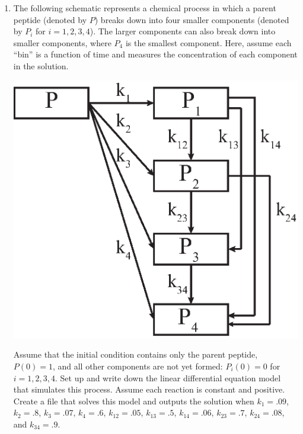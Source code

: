 \documentclass[10pt]{article}
\begin{document}
\begin{enumerate}[{$\qquad 1.]
\item The following schematic represents a chemical process in which a parent peptide (denoted by $P$) breaks down into four smaller components (denoted by $P_i$ for $i = 1, 2, 3, 4$).  The larger components can also break down into smaller components, where $P_4$ is the smallest component.  Here, assume each ``bin'' is a function of time and measures the concentration of each component in the solution.  
\begin{center}
\includegraphics[width = .3\textwidth]{Peptide_Final_Schematic.eps}
\end{center}
Assume that the initial condition contains only the parent peptide, $P(0) = 1$, and all other components are not yet formed: $P_i(0)  = 0$ for $i = 1, 2, 3, 4$.  Set up and write down the linear differential equation model that simulates this process.  Assume each reaction is constant and positive.  Create a file that solves this model and outputs the solution when $k_1 = .09$, $k_2 = .8$, $k_3 = .07$, $k_4 = .6$, $k_{12} = .05$, $k_{13} = .5$, $k_{14} = .06$, $k_{23} = .7$, $k_{24} = .08$, and $k_{34} = .9$.  
\end{enumerate}
\end{document}
